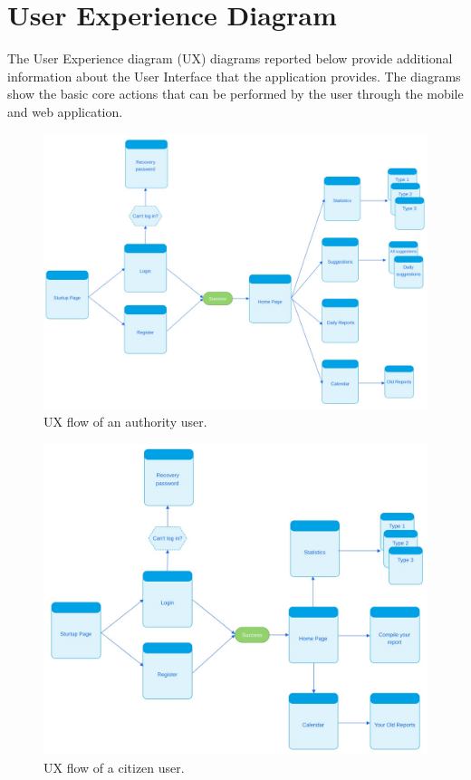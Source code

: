 \documentclass{report}
\begin{document}
\section{User Experience Diagram}
The User Experience diagram (UX) diagrams reported below provide additional information about the User
Interface that the application provides. The diagrams show the basic core actions
that can be performed by the user through the mobile and web application. 

\begin{figure}[!ht]
	\begin{center}
	\includegraphics[width=\textwidth]{img/AuthoritiesUX.png}
	\end{center}
    \caption{UX flow of an authority user.}
    
\end{figure}\begin{figure}[!ht]
	\begin{center}
	\includegraphics[width=\textwidth]{img/CitizenUX.png}
	\end{center}
	\caption{UX flow of a citizen user.}
\end{figure}
\end{document}

